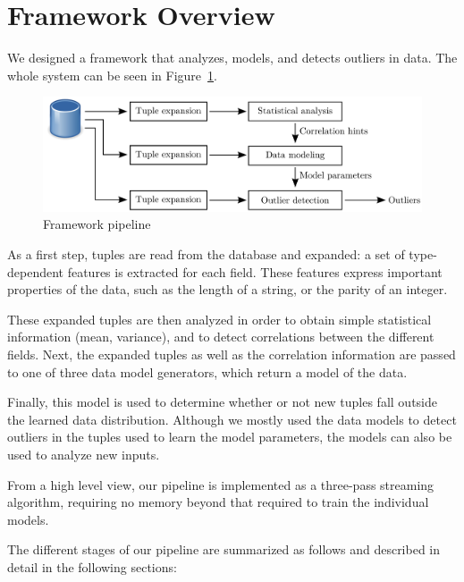 \section{Framework Overview}
\label{sec:overview}

We designed a framework that analyzes, models, and detects outliers in data.
The whole system can be seen in Figure~\ref{fig:pipeline}.

\begin{figure}
  \includegraphics[width=\textwidth]{../graphics/pipeline.pdf}
  \caption{Framework pipeline}
  \label{fig:pipeline}
\end{figure}

As a first step, tuples are read from the database and expanded: a set of type-dependent features is extracted for each field. These features express important properties of the data, such as the length of a string, or the parity of an integer.

These expanded tuples are then analyzed in order to obtain simple statistical information (mean, variance), and to detect correlations between the different fields. Next, the expanded tuples as well as the correlation information are passed to one of three data model generators, which return a model of the data.

Finally, this model is used to determine whether or not new tuples fall outside the learned data distribution. Although we mostly used the data models to detect outliers in the tuples used to learn the model parameters, the models can also be used to analyze new inputs.

From a high level view, our pipeline is implemented as a three-pass streaming algorithm, requiring no memory beyond that required to train the individual models.

The different stages of our pipeline are summarized as follows and described in detail in the following sections:

